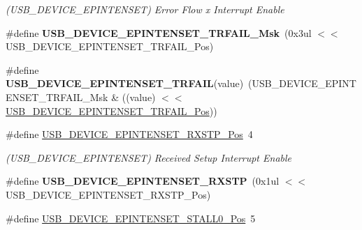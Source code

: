 \begin{DoxyCompactItemize}
\begin{DoxyCompactList}\small\item\em (U\+S\+B\+\_\+\+D\+E\+V\+I\+C\+E\+\_\+\+E\+P\+I\+N\+T\+E\+N\+S\+E\+T) Error Flow x Interrupt Enable \end{DoxyCompactList}\item 
\hypertarget{group___s_a_m_l21___u_s_b_gab738dde9c4627324310b1a3394777cad}{}\#define {\bfseries U\+S\+B\+\_\+\+D\+E\+V\+I\+C\+E\+\_\+\+E\+P\+I\+N\+T\+E\+N\+S\+E\+T\+\_\+\+T\+R\+F\+A\+I\+L\+\_\+\+Msk}~(0x3ul $<$$<$ U\+S\+B\+\_\+\+D\+E\+V\+I\+C\+E\+\_\+\+E\+P\+I\+N\+T\+E\+N\+S\+E\+T\+\_\+\+T\+R\+F\+A\+I\+L\+\_\+\+Pos)\label{group___s_a_m_l21___u_s_b_gab738dde9c4627324310b1a3394777cad}

\item 
\hypertarget{group___s_a_m_l21___u_s_b_ga4b3c9c5b701a223ea0b26c6fb649f578}{}\#define {\bfseries U\+S\+B\+\_\+\+D\+E\+V\+I\+C\+E\+\_\+\+E\+P\+I\+N\+T\+E\+N\+S\+E\+T\+\_\+\+T\+R\+F\+A\+I\+L}(value)~(U\+S\+B\+\_\+\+D\+E\+V\+I\+C\+E\+\_\+\+E\+P\+I\+N\+T\+E\+N\+S\+E\+T\+\_\+\+T\+R\+F\+A\+I\+L\+\_\+\+Msk \& ((value) $<$$<$ \hyperlink{group___s_a_m_l21___u_s_b_ga2c7e0bcecd62a0b34cfe393b85e4ebe5}{U\+S\+B\+\_\+\+D\+E\+V\+I\+C\+E\+\_\+\+E\+P\+I\+N\+T\+E\+N\+S\+E\+T\+\_\+\+T\+R\+F\+A\+I\+L\+\_\+\+Pos}))\label{group___s_a_m_l21___u_s_b_ga4b3c9c5b701a223ea0b26c6fb649f578}

\item 
\hypertarget{group___s_a_m_l21___u_s_b_gaee0c453573f16300f3bf3e826ea2d5f2}{}\#define \hyperlink{group___s_a_m_l21___u_s_b_gaee0c453573f16300f3bf3e826ea2d5f2}{U\+S\+B\+\_\+\+D\+E\+V\+I\+C\+E\+\_\+\+E\+P\+I\+N\+T\+E\+N\+S\+E\+T\+\_\+\+R\+X\+S\+T\+P\+\_\+\+Pos}~4\label{group___s_a_m_l21___u_s_b_gaee0c453573f16300f3bf3e826ea2d5f2}

\begin{DoxyCompactList}\small\item\em (U\+S\+B\+\_\+\+D\+E\+V\+I\+C\+E\+\_\+\+E\+P\+I\+N\+T\+E\+N\+S\+E\+T) Received Setup Interrupt Enable \end{DoxyCompactList}\item 
\hypertarget{group___s_a_m_l21___u_s_b_gaaa235c7f4fcde68a23da7e6955fcd42d}{}\#define {\bfseries U\+S\+B\+\_\+\+D\+E\+V\+I\+C\+E\+\_\+\+E\+P\+I\+N\+T\+E\+N\+S\+E\+T\+\_\+\+R\+X\+S\+T\+P}~(0x1ul $<$$<$ U\+S\+B\+\_\+\+D\+E\+V\+I\+C\+E\+\_\+\+E\+P\+I\+N\+T\+E\+N\+S\+E\+T\+\_\+\+R\+X\+S\+T\+P\+\_\+\+Pos)\label{group___s_a_m_l21___u_s_b_gaaa235c7f4fcde68a23da7e6955fcd42d}

\item 
\hypertarget{group___s_a_m_l21___u_s_b_ga9d4e0dafc83af56ed91e31e805585a56}{}\#define \hyperlink{group___s_a_m_l21___u_s_b_ga9d4e0dafc83af56ed91e31e805585a56}{U\+S\+B\+\_\+\+D\+E\+V\+I\+C\+E\+\_\+\+E\+P\+I\+N\+T\+E\+N\+S\+E\+T\+\_\+\+S\+T\+A\+L\+L0\+\_\+\+Pos}~5\label{group___s_a_m_l21___u_s_b_ga9d4e0dafc83af56ed91e31e805585a56}


\end{DoxyCompactItemize}
